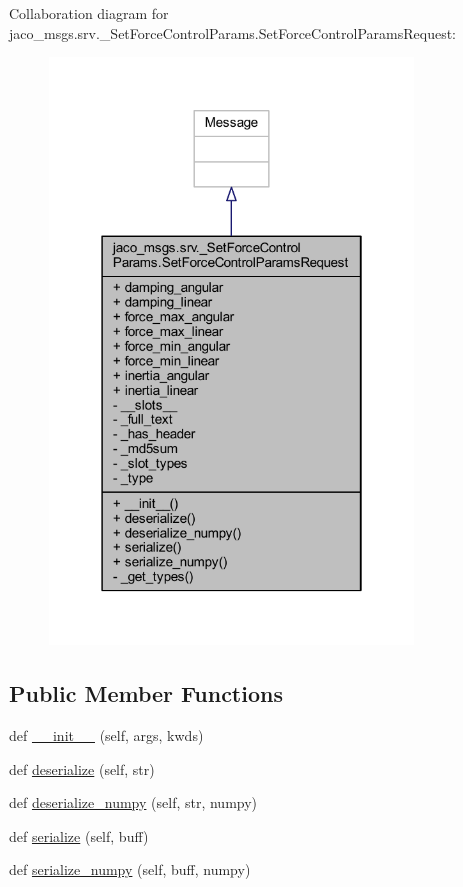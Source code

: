 Collaboration diagram for jaco\+\_\+msgs.\+srv.\+\_\+\+Set\+Force\+Control\+Params.\+Set\+Force\+Control\+Params\+Request\+:
\nopagebreak
\begin{figure}[H]
\begin{center}
\leavevmode
\includegraphics[width=274pt]{d3/d4d/classjaco__msgs_1_1srv_1_1__SetForceControlParams_1_1SetForceControlParamsRequest__coll__graph}
\end{center}
\end{figure}
\subsection*{Public Member Functions}
\begin{DoxyCompactItemize}
\item 
def \hyperlink{classjaco__msgs_1_1srv_1_1__SetForceControlParams_1_1SetForceControlParamsRequest_a70d95a44801ab7fb588b293e5a4720b1}{\+\_\+\+\_\+init\+\_\+\+\_\+} (self, args, kwds)
\item 
def \hyperlink{classjaco__msgs_1_1srv_1_1__SetForceControlParams_1_1SetForceControlParamsRequest_a35493ad58112dc434913f2a716031a7e}{deserialize} (self, str)
\item 
def \hyperlink{classjaco__msgs_1_1srv_1_1__SetForceControlParams_1_1SetForceControlParamsRequest_ad90e181f15a53f469646294c7a0d3889}{deserialize\+\_\+numpy} (self, str, numpy)
\item 
def \hyperlink{classjaco__msgs_1_1srv_1_1__SetForceControlParams_1_1SetForceControlParamsRequest_a54db0a314e71d1c54b0231ac40215514}{serialize} (self, buff)
\item 
def \hyperlink{classjaco__msgs_1_1srv_1_1__SetForceControlParams_1_1SetForceControlParamsRequest_a7aa1dcb3d276ef89fc31a96b1e8f0b21}{serialize\+\_\+numpy} (self, buff, numpy)
\end{DoxyCompactItemize}
